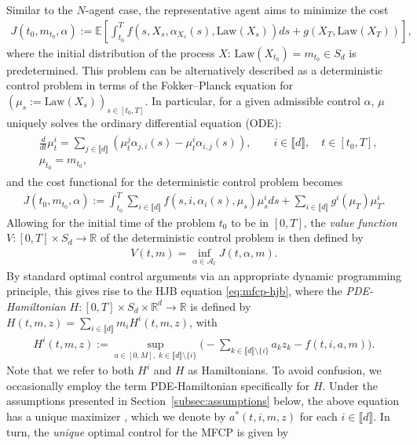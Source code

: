 \documentclass[11pt,reqno]{amsart}
\numberwithin{equation}{section}
\theoremstyle{plain}
\newcommand{\R}{\mathbb{R}}
\newcommand{\E}{\mathbb{E}}
\newcommand{\lbrs}[1]{\llbracket #1 \rrbracket}
\begin{document}
Similar to the $N$-agent case, the representative agent aims to minimize the cost
\begin{align}
    J(t_0, m_{t_0}, \alpha) := \E\left[\int_{t_0}^T f(s, X_s, \alpha_{X_s}(s), \text{Law}(X_s))ds + g(X_T, \text{Law}(X_T))\right] \label{eq:mfcp-cost},
\end{align}
where the initial distribution of the process $X$: $\text{Law}(X_{t_0}) = m_{t_0}\in S_d$ is predetermined. This problem can be alternatively described as a deterministic control problem in terms of the Fokker--Planck equation for $(\mu_s := \text{Law}(X_s))_{s\in[t_0,T]}$. In particular, for a given admissible control $\alpha$, $\mu$ uniquely solves the ordinary differential equation (ODE):
\begin{align}
\label{eq:forward-eq}
\begin{split}
    &\frac{d}{dt}\mu_t^i = \sum_{j \in \lbrs{d}} \left(\mu_t^j \alpha_{j,i}(s) - \mu_t^i \alpha_{i,j}(s)\right),\qquad i\in\lbrs{d}, \quad t\in[t_0,T], \\
    &\mu_{t_0} = m_{t_0},
\end{split}
\end{align}
and the cost functional for the deterministic control problem becomes
\begin{align}
    \label{eq:det-mfcp-cost}
    J(t_0, m_{t_0},\alpha) := \int_{t_0}^{T} \sum_{i \in \lbrs{d}} f(s, i, \alpha_{i}(s), \mu_s) \mu_s^i ds + \sum_{i \in \lbrs{d}} g^i(\mu_T) \mu_T^i.
\end{align}
Allowing for the initial time of the problem $t_0$ to be in $[0,T]$, the {\it value function} $V:[0,T]\times S_d\to\R$ of the deterministic control problem is then defined by
\begin{align}
    \label{eq:value-function}
    V(t, m) = \inf_{\alpha \in \mathcal{A}_{t}} J(t, \alpha, m).
\end{align}
By standard optimal control arguments via an appropriate dynamic programming principle, this gives rise to the HJB equation \eqref{eq:mfcp-hjb}, where the {\it PDE-Hamiltonian} $H : [0, T] \times S_d \times \R^d \to \R$ is defined by $H(t, m, z) = \sum_{i \in \lbrs{d}} m_i H^i(t, m, z)$, with
\begin{align}
\label{eq:hamiltonian}
    H^i(t,m,z) := \sup_{a \in [0, M], \;k\in\lbrs{d}\setminus\{i\}} \Big(-\sum_{k\in\lbrs{d}\setminus\{i\}}a_k z_k - f(t,i,a,m)\Big).
\end{align}
Note that we refer to both $H^i$ and $H$ as Hamiltonians. To avoid confusion, we occasionally employ the term PDE-Hamiltonian specifically for $H$. Under the assumptions presented in Section~\ref{subsec:assumptions} below, the above equation has a unique maximizer \cite{unique-optimal-control-mfg}, which we denote by $a^*(t, i, m, z)$ for each $i \in \lbrs{d}$. In turn, the \textit{unique} optimal control for the MFCP is given by
\end{document}

